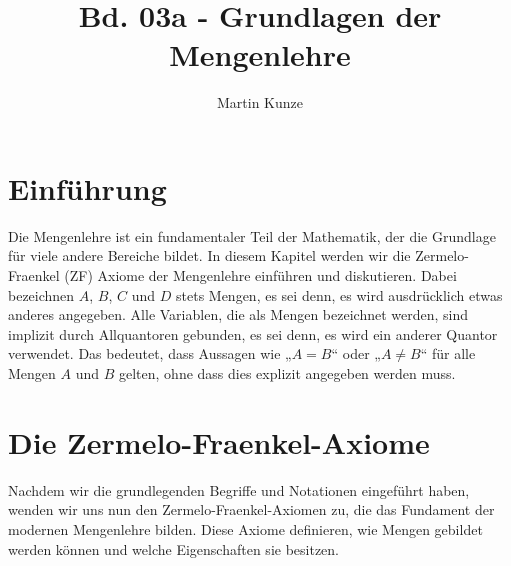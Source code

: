 \documentclass[main.tex]{subfiles}
\title{Bd. 03a - Grundlagen der Mengenlehre}
\author{Martin Kunze}
\date{}
\begin{document}
\ifSubfilesClassLoaded{
  \ifdefined\BThreeSuppressPartFrontmatter
  \else
    \maketitle
    \setcounter{tocdepth}{3}
    \tableofcontents
  \fi
}{}
\setcounter{file}{3}
\renewcommand{\FormulaBandID}{3}
\setcounter{chapter}{0}

\chapter{Einführung}

Die Mengenlehre ist ein fundamentaler Teil der Mathematik, der die Grundlage für viele andere Bereiche bildet. In diesem Kapitel werden wir die Zermelo-Fraenkel (ZF) Axiome der Mengenlehre einführen und diskutieren. Dabei bezeichnen \( A \), \( B \), \( C \) und \( D \) stets Mengen, es sei denn, es wird ausdrücklich etwas anderes angegeben. Alle Variablen, die als Mengen bezeichnet werden, sind implizit durch Allquantoren gebunden, es sei denn, es wird ein anderer Quantor verwendet. Das bedeutet, dass Aussagen wie „\( A = B \)“ oder „\( A \neq B \)“ für alle Mengen \( A \) und \( B \) gelten, ohne dass dies explizit angegeben werden muss.

\chapter{Die Zermelo-Fraenkel-Axiome}

Nachdem wir die grundlegenden Begriffe und Notationen eingeführt haben, wenden wir uns nun den Zermelo-Fraenkel-Axiomen zu, die das Fundament der modernen Mengenlehre bilden. Diese Axiome definieren, wie Mengen gebildet werden können und welche Eigenschaften sie besitzen.
\end{document}
